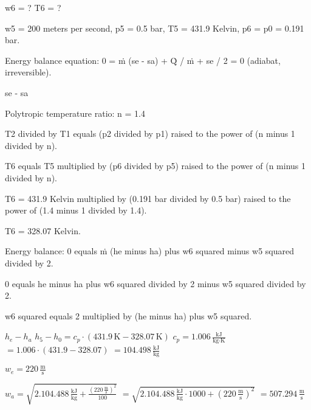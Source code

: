 w6 = ?  
T6 = ?  

w5 = 200 meters per second, p5 = 0.5 bar, T5 = 431.9 Kelvin, p6 = p0 = 0.191 bar.  

Energy balance equation:  
0 = ṁ (se - sa) + Q̇ / ṁ + se / 2 = 0 (adiabat, irreversible).  

se - sa  

Polytropic temperature ratio:  
n = 1.4  

T2 divided by T1 equals (p2 divided by p1) raised to the power of (n minus 1 divided by n).  

T6 equals T5 multiplied by (p6 divided by p5) raised to the power of (n minus 1 divided by n).  

T6 = 431.9 Kelvin multiplied by (0.191 bar divided by 0.5 bar) raised to the power of (1.4 minus 1 divided by 1.4).  

T6 = 328.07 Kelvin.  

Energy balance:  
0 equals ṁ (he minus ha) plus w6 squared minus w5 squared divided by 2.  

0 equals he minus ha plus w6 squared divided by 2 minus w5 squared divided by 2.  

w6 squared equals 2 multiplied by (he minus ha) plus w5 squared.

\( h_e - h_a \)  
\( h_5 - h_0 = c_p \cdot (431.9 \, \text{K} - 328.07 \, \text{K}) \)  
\( c_p = 1.006 \, \frac{\text{kJ}}{\text{kg·K}} \)  
\( = 1.006 \cdot (431.9 - 328.07) \)  
\( = 104.498 \, \frac{\text{kJ}}{\text{kg}} \)  

\( w_e = 220 \, \frac{\text{m}}{\text{s}} \)  

\( w_a = \sqrt{2.104.488 \, \frac{\text{kJ}}{\text{kg}} + \frac{(220 \, \frac{\text{m}}{\text{s}})^2}{100}} \)  
\( = \sqrt{2.104.488 \, \frac{\text{kJ}}{\text{kg}} \cdot 1000 + (220 \, \frac{\text{m}}{\text{s}})^2} \)  
\( = 507.294 \, \frac{\text{m}}{\text{s}} \)